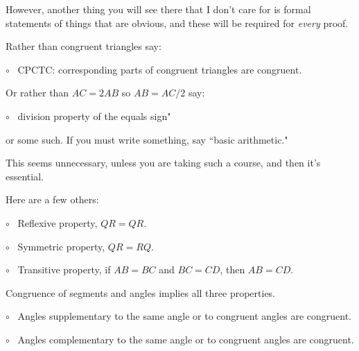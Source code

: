 \documentclass[11pt, oneside]{article}
\begin{document}
However, another thing you will see there that I don't care for is formal statements of things that are obvious, and these will be required for \emph{every} proof.

Rather than congruent triangles say:

$\circ$ \ CPCTC: corresponding parts of congruent triangles are congruent.

Or rather than $AC = 2 AB$ so $AB = AC/2$ say:

$\circ$ \ division property of the equals sign"

or some such.  If you must write something, say ``basic arithmetic."

This seems unnecessary, unless you are taking such a course, and then it's essential.

Here are a few others:

$\circ$ \ Reflexive property, $QR = QR$.

$\circ$ \ Symmetric property, $QR = RQ$.

$\circ$ \ Transitive property, if $AB = BC$ and $BC = CD$, then $AB = CD$.

Congruence of segments and angles implies all three properties.

$\circ$ \ Angles supplementary to the same angle or to congruent angles are congruent.

$\circ$ \ Angles complementary to the same angle or to congruent angles are congruent.
\end{document}
